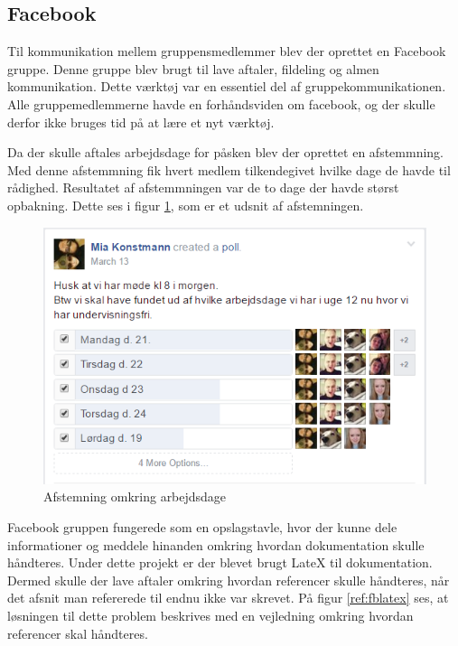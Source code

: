 \subsection{Facebook}
Til kommunikation mellem gruppensmedlemmer blev der oprettet en Facebook \cite{facebook} gruppe. Denne gruppe blev brugt til lave aftaler, fildeling og almen kommunikation. Dette værktøj var en essentiel del af gruppekommunikationen. Alle gruppemedlemmerne havde en forhåndsviden om facebook, og der skulle derfor ikke bruges tid på at lære et nyt værktøj. \newline

\noindent Da der skulle aftales arbejdsdage for påsken blev der oprettet en afstemmning. Med denne afstemmning fik hvert medlem tilkendegivet hvilke dage de havde til rådighed. Resultatet af afstemmningen var de to dage der havde størst opbakning. Dette ses i figur \ref{ref:fbpoll}, som er et udsnit af afstemningen.
\begin{figure}[H]
	\centering
	\includegraphics[scale=0.6]{Projektgennemfoerelse/images/fbpoll}
	\caption{Afstemning omkring arbejdsdage}
	\label{ref:fbpoll}
\end{figure}

\noindent Facebook gruppen fungerede som en opslagstavle, hvor der kunne dele informationer og meddele hinanden omkring hvordan dokumentation skulle håndteres. Under dette projekt er der blevet brugt LateX til dokumentation. Dermed skulle der lave aftaler omkring hvordan referencer skulle håndteres, når det afsnit man refererede til endnu ikke var skrevet. På figur \ref{ref:fblatex} ses, at løsningen til dette problem beskrives med en vejledning omkring hvordan referencer skal håndteres.


